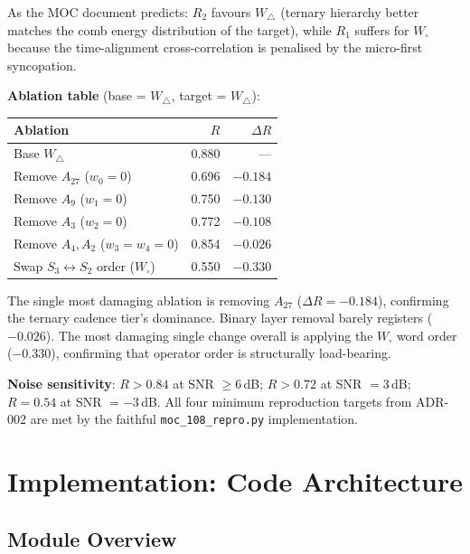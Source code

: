 \documentclass[11pt,a4paper]{article}
\theoremstyle{plain}
\theoremstyle{definition}
\theoremstyle{remark}
\begin{document}
As the MOC document predicts: $R_2$ favours $W_\triangle$ (ternary hierarchy better
matches the comb energy distribution of the target), while $R_1$ suffers for $W_\square$
because the time-alignment cross-correlation is penalised by the micro-first syncopation.

\textbf{Ablation table} (base = $W_\triangle$, target = $W_\triangle$):

\begin{center}
\begin{tabular}{lrr}
  \toprule
  Ablation & $R$ & $\Delta R$ \\
  \midrule
  Base $W_\triangle$ & 0.880 & --- \\
  Remove $A_{27}$ ($w_0 = 0$) & 0.696 & $-0.184$ \\
  Remove $A_{9}$  ($w_1 = 0$) & 0.750 & $-0.130$ \\
  Remove $A_{3}$  ($w_2 = 0$) & 0.772 & $-0.108$ \\
  Remove $A_4, A_2$ ($w_3 = w_4 = 0$) & 0.854 & $-0.026$ \\
  Swap $S_3 \leftrightarrow S_2$ order ($W_\square$) & 0.550 & $-0.330$ \\
  \bottomrule
\end{tabular}
\end{center}

The single most damaging ablation is removing $A_{27}$ ($\Delta R = -0.184$), confirming
the ternary cadence tier's dominance. Binary layer removal barely registers ($-0.026$).
The most damaging single change overall is applying the $W_\square$ word order ($-0.330$),
confirming that operator order is structurally load-bearing.

\textbf{Noise sensitivity}: $R > 0.84$ at SNR $\ge 6$\,dB; $R > 0.72$ at SNR $= 3$\,dB;
$R = 0.54$ at SNR $= -3$\,dB. All four minimum reproduction targets from ADR-002 are met
by the faithful \texttt{moc\_108\_repro.py} implementation.

\section{Implementation: Code Architecture}

\subsection{Module Overview}
\end{document}
